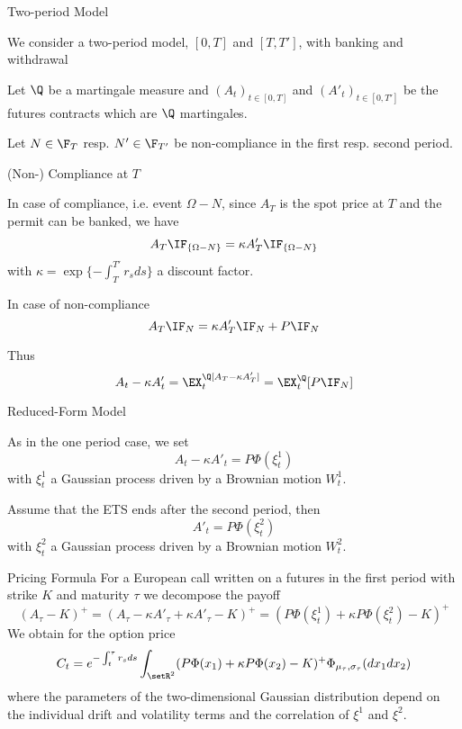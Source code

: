 {Two-period Model}


	We consider a two-period model, $[0,T]$ and $[T,T']$, with banking and withdrawal

	Let $\Q$ be a martingale measure and $(A_t)_{t\in[0,T]}$ and $(A'_t)_{t\in[0,T']}$
be the futures contracts which are $\Q$ martingales.

	Let $N\in \F_T$ resp. $N' \in \F_{T'}$ be non-compliance in the first resp. second period.


{(Non-) Compliance at $T$}


	In case of compliance, i.e. event $\Omega-N$, since $A_T$ is the spot price at $T$ and the permit can be banked,  we have
$$
A_T\IF_{\{\Omega-N\}}= \kappa A'_T \IF_{\{\Omega-N\}}
$$
with $\kappa= \exp\{-\int_T^{T'}r_s ds\}$ a discount factor.

	In case of non-compliance
$$
A_T\IF_{N}= \kappa A'_T \IF_{N} + P\IF_N
$$

	Thus
$$
A_t-\kappa A'_t = \EX_t^\Q[A_T-\kappa A'_T]= \EX^\Q_t[P \IF_N]
$$


{Reduced-Form Model}


	As in the one period case,  we set
$$
A_t-\kappa A'_t = P \Phi(\xi_t^1)
$$
with $\xi^1_t$ a Gaussian process driven by a Brownian motion $W^1_t$.

	Assume that the ETS ends after the second period, then
$$
A'_t = P \Phi(\xi^2_t)
$$
with $\xi^2_t$ a Gaussian process driven by a Brownian motion $W^2_t$.


{Pricing Formula}
For a European call written on a futures in the first period with strike $K$ and maturity $\tau$ we decompose the payoff
$$
(A_\tau-K)^+= (A_\tau - \kappa A'_\tau + \kappa A'_\tau -K )^+= (P\Phi(\xi^1_t) + \kappa P \Phi(\xi_t^2) -K)^+
$$
We obtain for the option price
$$
C_t = e^{-\int_t^\tau r_s ds} \int_{\setR^2} (P\Phi(x_1)+\kappa P \Phi(x_2) -K)^+ \Phi_{\mu_\tau, \sigma_\tau}(dx_1dx_2)
$$
where the parameters of the two-dimensional Gaussian distribution depend on the individual drift and volatility terms and the correlation
of $\xi^1$ and $\xi^2$.

